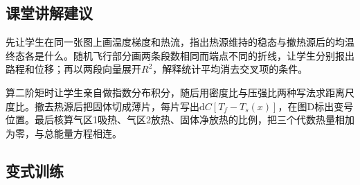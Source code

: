\documentclass[UTF8,fontset=fandol,a4paper,11pt]{ctexart}
\begin{document}

\subsection*{课堂讲解建议}

先让学生在同一张图上画温度梯度和热流，指出热源维持的稳态与撤热源后的均温终态各是什么。随机飞行部分画两条段数相同而端点不同的折线，让学生分别报出路程和位移；再以两段向量展开$R^2$，解释统计平均消去交叉项的条件。

算二阶矩时让学生亲自做指数分布积分，随后用密度比与压强比两种写法求距离尺度比。撤去热源后把固体切成薄片，每片写出$\mathrm dC[T_f-T_s(x)]$，在图D标出变号位置。最后核算气区1吸热、气区2放热、固体净放热的比例，把三个代数热量相加为零，与总能量方程相连。



\subsection*{变式训练}
\end{document}
